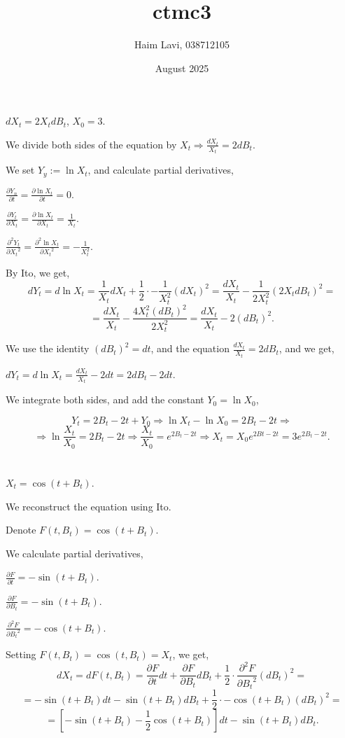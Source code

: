 \documentclass{article}
\title{ctmc3}
\author{Haim Lavi, 038712105}
\date{August 2025}
\begin{document}
\maketitle

\section{}
$dX_t=2X_tdB_t$, $X_0=3$.

We divide both sides of the equation by $X_t\Rightarrow\frac{dX_t}{X_t}=2dB_t$.

We set $Y_y:=\ln{X_t}$, and calculate partial derivatives,

$\frac{\partial{Y_n}}{\partial{t}}=\frac{\partial\ln{X_t}}{\partial{t}}=0$.

$\frac{\partial{Y_t}}{\partial{X_t}}=\frac{\partial\ln{X_t}}{\partial{X_t}}=\frac{1}{X_t}$.

$\frac{\partial^2{Y_t}}{\partial{X_t}^2}=\frac{\partial^2\ln{X_t}}{\partial{X_t}^2}=-\frac{1}{X_t^2}$.

\noindent
By Ito, we get,
\[dY_t=d\ln{X_t}=\frac{1}{X_t}dX_t+\frac{1}{2}\cdot-\frac{1}{X_t^2}(dX_t)^2=\frac{dX_t}{X_t}-\frac{1}{2X_t^2}(2X_tdB_t)^2=\]\[=\frac{dX_t}{X_t}-\frac{4X_t^2(dB_t)^2}{2X_t^2}=\frac{dX_t}{X_t}-2(dB_t)^2.\]

We use the identity $(dB_t)^2=dt$, and the equation $\frac{dX_t}{X_t}=2dB_t$, and we get,

$dY_t=d\ln{X_t}=\frac{dX_t}{X_t}-2dt=2dB_t-2dt$.

We integrate both sides, and add the constant $Y_0=\ln{X_0}$,

\[Y_t=2B_t-2t+Y_0\Rightarrow{\ln{X_t}-\ln{X_0}=2B_t-2t}\Rightarrow\]\[\Rightarrow\ln\frac{X_t}{X_0}=2B_t-2t\Rightarrow\frac{X_t}{X_0}=e^{2B_t-2t}\Rightarrow{X_t=X_0e^{2Bt-2t}}=3e^{2B_t-2t}.\]
\section{}
$X_t=\cos(t+B_t)$.

We reconstruct the equation using Ito.

Denote $F(t,B_t)=\cos(t+B_t)$.

We calculate partial derivatives,

$\frac{\partial{F}}{\partial{t}}=-\sin(t+B_t)$.

$\frac{\partial{F}}{\partial{B_t}}=-\sin(t+B_t)$.

$\frac{\partial^2{F}}{\partial{B_t}^2}=-\cos(t+B_t)$.

Setting $F(t,B_t)=\cos(t,B_t)=X_t$, we get,
\noindent
\[dX_t=dF(t,B_t)=\frac{\partial{F}}{\partial{t}}dt+\frac{\partial{F}}{\partial{B_t}}dB_t+\frac{1}{2}\cdot\frac{\partial^2{F}}{\partial{B_t}^2}(dB_t)^2=\]\[=-\sin(t+B_t)dt-\sin(t+B_t)dB_t+\frac{1}{2}\cdot-\cos(t+B_t)(dB_t)^2=\]\[=[-\sin(t+B_t)-\frac{1}{2}\cos(t+B_t)]dt-\sin(t+B_t)dB_t.\]
\end{document}
